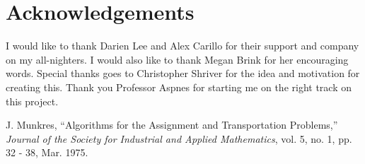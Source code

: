 \documentclass[letterpaper]{article}
\begin{document}
\section*{Acknowledgements}
I would like to thank Darien Lee and Alex Carillo for their support and company on my all-nighters. I would also like to
thank Megan Brink for her encouraging words. Special thanks goes to Christopher Shriver for the idea and motivation for
creating this. Thank you Professor Aspnes for starting me on the right track on this project.






\begin{thebibliography}{11}
       J. Munkres,
        ``Algorithms for the Assignment and Transportation Problems,''
        \emph{Journal of the Society for Industrial and Applied Mathematics},
        vol. 5, no. 1, pp. 32 - 38, Mar. 1975.
\end{thebibliography}
\end{document}
